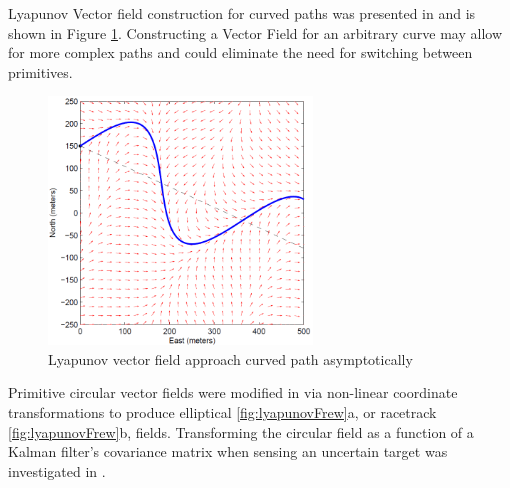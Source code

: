 \documentclass[numbered,pdftex]{ohio-etd}
\begin{document}
Lyapunov Vector field construction for curved paths was presented in \cite{griffiths_vector_2006} and is shown in Figure \ref{fig:griffiths}. Constructing a Vector Field for an arbitrary curve may allow for more complex paths and could eliminate the need for switching between primitives. 

\begin{figure}[H]
	\centering
	\includegraphics[width=7cm]{PaperFigures/griffiths}
	\caption{Lyapunov vector field approach curved path asymptotically \cite{griffiths_vector_2006}}
	\label{fig:griffiths}
\end{figure}


Primitive circular vector fields were modified in \cite{frew_lyapunov_nodate,frew_cooperative_2007} via non-linear coordinate transformations to produce elliptical \ref{fig:lyapunovFrew}a, or racetrack \ref{fig:lyapunovFrew}b, fields. Transforming the circular field as a function of a Kalman filter's covariance matrix when sensing an uncertain target was investigated in \cite{frew_cooperative_2007}. 
\end{document}
